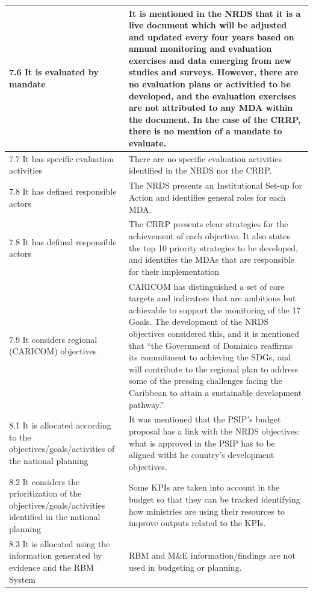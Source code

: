 \documentclass[
  10pt,
]{book}
\begin{document}
\begin{table}
\begin{tabular}[t]{l|l}
\hline
\hspace{1em}7.6 It is evaluated by mandate & It is mentioned in the NRDS that it is a live document which will be adjusted and updated every four years based on annual monitoring and evaluation exercises and data emerging from new studies and surveys. However, there are no evaluation plans or activitied to be developed, and the evaluation exercises are not attributed to any MDA within the document. In the case of the CRRP, there is no mention of a mandate to evaluate.\\
\hline
\hspace{1em}7.7 It has specific evaluation activities & There are no specific evaluation activities identified in the NRDS nor the CRRP.\\
\hline
\hspace{1em}7.8 It has defined responsible actors & The NRDS presents an Institutional Set-up for Action and identifies general roles for each MDA.\\
\hline
7.8 It has defined responsible actors & The CRRP presents clear strategies for the achievement of each objective. It also states the top 10 priority strategies to be developed, and identifies the MDAs that are responsible for their implementation\\
\hline
7.9 It considers regional (CARICOM) objectives & CARICOM has distinguished a set of core targets and indicators that are ambitious but achievable to support the monitoring of the 17 Goals. The development of the NRDS objectives considered this, and it is mentioned that “the Government of Dominica reaffirms its commitment to achieving the SDGs, and will contribute to the regional plan to address some of the pressing challenges facing the Caribbean to attain a sustainable development pathway.”\\
\hline
8.1 It is allocated according to the objectives/goals/activities of the national planning & It was mentioned that the PSIP’s budget proposal has a link with the NRDS objectives: what is approved in the PSIP has to be aligned witht he country’s development objectives.\\
\hline
8.2 It considers the prioritization of the objectives/goals/activities identified in the national planning & Some KPIs are taken into account in the budget so that they can be tracked identifying how ministries are using their resources to improve outputs related to the KPIs.\\
\hline
8.3 It is allocated using the information generated by evidence and the RBM System & RBM and M\&E information/findings are not used in budgeting or planning.\\

\end{tabular}
\end{table}
\end{document}
